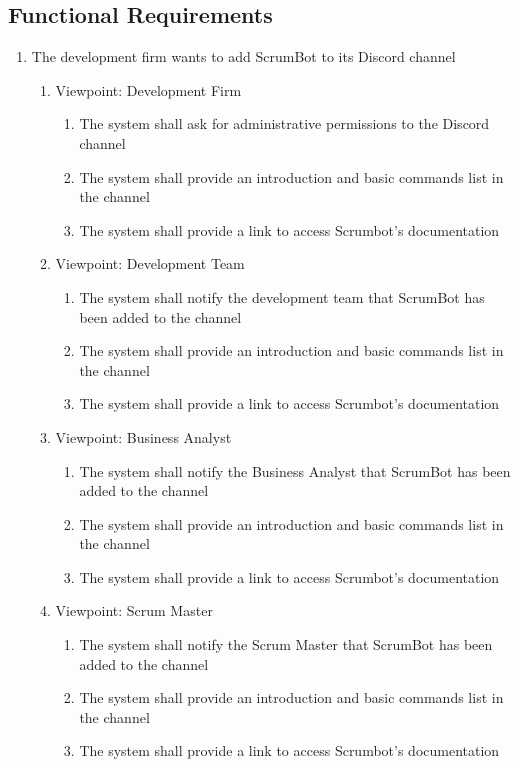 \documentclass[12pt, titlepage]{article}
\begin{document}
\subsection{Functional Requirements}
\begin{enumerate}[{BE}1.]
    \item The development firm wants to add ScrumBot to its Discord channel
    \begin{enumerate}[{VP}1.]
        \item Viewpoint: Development Firm
            \begin{enumerate}
                \item The system shall ask for administrative permissions to the Discord channel
                \item The system shall provide an introduction and basic commands list in the channel
                \item The system shall provide a link to access Scrumbot's documentation
            \end{enumerate}
        \item Viewpoint: Development Team
            \begin{enumerate}
                \item The system shall notify the development team that ScrumBot has been added to the channel
                \item The system shall provide an introduction and basic commands list in the channel
                \item The system shall provide a link to access Scrumbot's documentation
            \end{enumerate}
            
        \item Viewpoint: Business Analyst
            \begin{enumerate}
                \item The system shall notify the Business Analyst that ScrumBot has been added to the channel
                \item The system shall provide an introduction and basic commands list in the channel
                \item The system shall provide a link to access Scrumbot's documentation
            \end{enumerate}
            
        \item Viewpoint: Scrum Master
            \begin{enumerate}
                \item The system shall notify the Scrum Master that ScrumBot has been added to the channel
                \item The system shall provide an introduction and basic commands list in the channel
                \item The system shall provide a link to access Scrumbot's documentation
            \end{enumerate}
    \end{enumerate}


\end{enumerate}
\end{document}
